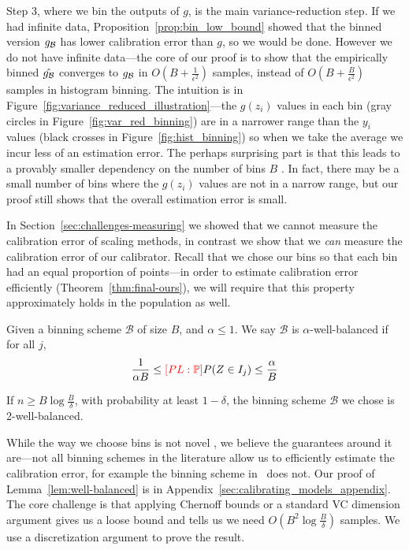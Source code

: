 Step 3, where we bin the outputs of $g$, is the main variance-reduction step. If we had infinite data, Proposition~\ref{prop:bin_low_bound} showed that the binned version $g_{\mathcal{B}{}}$ has lower calibration error than $g$, so we would be done. However we do not have infinite data---the core of our proof is to show that the empirically binned $\hat{g_{\mathcal{B}{}}}$ converges to $g_{\mathcal{B}{}}$ in $O(B + \frac{1}{\epsilon^2})$ samples, instead of $O(B + \frac{B}{\epsilon^2})$ samples in histogram binning. The intuition is in Figure~\ref{fig:variance_reduced_illustration}---the $g(z_i)$ values in each bin (gray circles in Figure~\ref{fig:var_red_binning}) are in a narrower range than the $y_i$ values (black crosses in Figure~\ref{fig:hist_binning}) so when we take the average\pl{,} we incur less of an estimation error. The perhaps surprising part is that this leads to a provably smaller dependency on the number of bins $B$ . In fact, there may be a small number of bins where the $g(z_i)$ values are not in a narrow range, but our proof still shows that the overall estimation error is small.

In Section~\ref{sec:challenges-measuring} we showed that we cannot measure the calibration error of scaling methods, in contrast we show that we \emph{can} measure the calibration error of our calibrator. Recall that we chose our bins so that each bin had an equal proportion of points---in order to estimate calibration error efficiently (Theorem~\ref{thm:final-ours}), we will require that this property approximately holds in the population as well.

\begin{definition}
Given a binning scheme $\mathcal{B}$ of size $B$, and $\alpha \leq 1$. We say $\mathcal{B}$ is $\alpha$-well-balanced if for all $j$,
  \[ \frac{1}{\alpha B} \leq \textcolor{red}{[PL: \mathbb P]} P(Z \in I_j) \leq \frac{\alpha}{B}\]
\end{definition}

\begin{lemma}
\label{lem:well-balanced}
If $n \geq B\log{\frac{B}{\delta}}$, with probability at least $1 - \delta$, the binning scheme $\mathcal{B}$ we chose is 2-well-balanced.
\end{lemma}

While the way we choose bins is not novel , we believe the guarantees around it are---not all binning schemes in the literature allow us to efficiently estimate the calibration error, for example the binning scheme in~\cite{guo2017calibration} does not. Our proof of Lemma~\ref{lem:well-balanced} is in Appendix~\ref{sec:calibrating_models_appendix}. The core challenge is that applying Chernoff bounds or  a standard VC dimension argument gives us a loose bound and tells us we need $O(B^2\log{\frac{B}{\delta}})$ samples. We use a discretization argument to prove the result.

